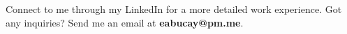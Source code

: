 
\begin{cvinterests}
    {Connect to me through my LinkedIn for a more detailed work experience. Got any inquiries? \newline
    Send me an email at \textbf{eabucay@pm.me}.}
\end{cvinterests}
